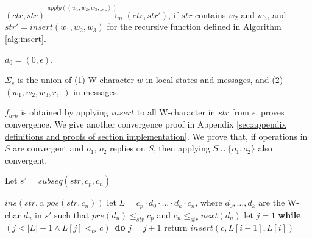 \begin{itemize}
{\item[-] $(\mathit{ctr},\mathit{str}) \xrightarrow{\mathit{apply}((w_1,w_2,w_3,\_,\_))}_m (\mathit{ctr},\mathit{str}')$, if $\mathit{str}$ contains $w_2$ and $w_3$, and $\mathit{str}' = \mathit{insert}(w_1,w_2,w_3)$ for the recursive function defined in Algorithm \ref{alg:insert}.
}

\item[-] $d_0 = (0,\epsilon)$.

\item[-] $\Sigma_e$ is the union of (1) W-character $w$ in local states and messages, and (2) $(w_1,w_2,w_3,r,\_)$ in messages.

\item[-] {\color {red}$f_{arb}$ is obtained by applying $\mathit{insert}$ to all W-character in $\mathit{str}$ from $\epsilon$. \cite{Oster:2006} proves convergence. We give another convergence proof in Appendix \ref{sec:appendix definitions and proofs of section implementation}. We prove that, if operations in $S$ are convergent and $o_1$, $o_2$ replies on $S$, then applying $S \cup \{ o_1,o_2 \}$ also convergent.}



\end{itemize}

\begin{algorithm}[t]

Let $s' = \mathit{subseq}(\mathit{str},c_p,c_n)$ \;

{
    \Return $\mathit{ins}(\mathit{str},c,\mathit{pos}(\mathit{str},c_n))$\;
}
\Else
{
    let $L = c_p \cdot d_0 \cdot \ldots \cdot d_k \cdot c_n$, where $d_0,\ldots,d_k$ are the W-char $d_u$ in $s'$ such that $\mathit{pre}(d_u) \leq_{\mathit{str}} c_p$ and $c_n \leq_{\mathit{str}} \mathit{next}(d_u)$\;
    let $j = 1$\;
    {\bf while} $(j < \vert L \vert -1 \wedge L[j] <_{\mathit{ts}} c)$\ {\bf do}
    {
        $j = j+1$\;
    }
    return $\mathit{insert}(c,L[i-1],L[i])$\;
}
\caption{$\mathit{insert}$}
\label{alg:insert}
\end{algorithm}


















